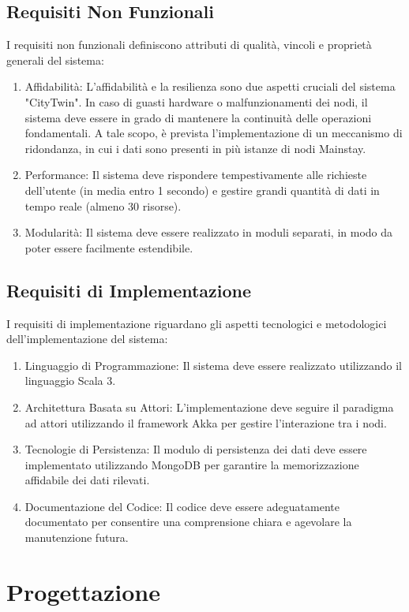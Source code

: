 \documentclass{scrartcl}
\begin{document}
\subsection{Requisiti Non Funzionali}
I requisiti non funzionali definiscono attributi di qualità, vincoli e proprietà generali del sistema:
\begin{enumerate}
    \item Affidabilità: L'affidabilità e la resilienza sono due aspetti cruciali del sistema "CityTwin". In caso di guasti hardware o malfunzionamenti dei nodi, il sistema deve essere in grado di mantenere la continuità delle operazioni fondamentali. A tale scopo, è prevista l'implementazione di un meccanismo di ridondanza, in cui i dati sono presenti in più istanze di nodi Mainstay.
    \item Performance: Il sistema deve rispondere tempestivamente alle richieste dell'utente (in media entro 1 secondo) e gestire grandi quantità di dati in tempo reale (almeno 30 risorse).
    \item Modularità: Il sistema deve essere realizzato in moduli separati, in modo da poter essere facilmente estendibile.
\end{enumerate}

\subsection{Requisiti di Implementazione}
I requisiti di implementazione riguardano gli aspetti tecnologici e metodologici dell'implementazione del sistema:
\begin{enumerate}
    \item Linguaggio di Programmazione: Il sistema deve essere realizzato utilizzando il linguaggio Scala 3.
    \item Architettura Basata su Attori: L'implementazione deve seguire il paradigma ad attori utilizzando il framework Akka per gestire l'interazione tra i nodi.
    \item Tecnologie di Persistenza: Il modulo di persistenza dei dati deve essere implementato utilizzando MongoDB per garantire la memorizzazione affidabile dei dati rilevati.
    \item Documentazione del Codice: Il codice deve essere adeguatamente documentato per consentire una comprensione chiara e agevolare la manutenzione futura.
\end{enumerate}

\section{Progettazione}
\end{document}
